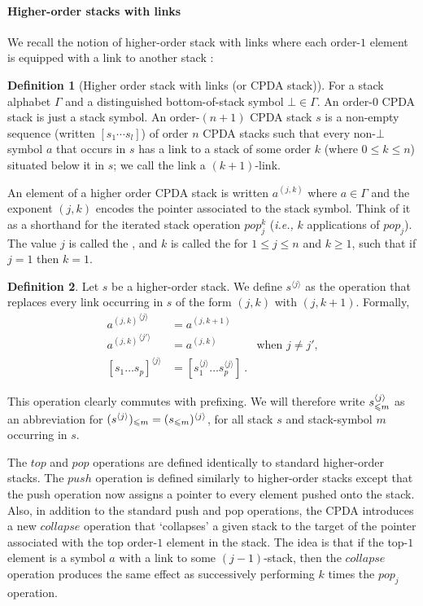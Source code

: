 \documentclass[a4paper]{article}[12pt]
\theoremstyle{remark}
\theoremstyle{definition}
\newtheorem{definition}{Definition}[section]
\begin{document}
\paragraph{Higher-order stacks with links}

We recall the notion of higher-order stack with links where each order-$1$ element is equipped with a link to another stack \cite{hague-collaps-full}:

\begin{definition}[Higher order stack with links (or CPDA stack)]
For a stack alphabet $\Gamma$ and a distinguished bottom-of-stack symbol $\bot\in \Gamma$. An order-$0$ CPDA stack is just a stack symbol. An order-$(n+1)$ CPDA stack $s$ is a non-empty sequence (written $[s_1 \cdots s_l]$) of order $n$ CPDA stacks such that every non-$\bot$ symbol $a$ that occurs in $s$ has a link to a stack of some order $k$ (where $0 \leq k \leq n$) situated below it in $s$; we call the link a $(k + 1)$-link.
\end{definition}

An element of a higher order CPDA stack is written $a^{(j,k)}$ where $a\in \Gamma$ and the exponent $(j,k)$ encodes the pointer associated to the stack symbol. Think of it as a shorthand for the iterated stack operation $pop_j^k$ ({\it i.e.,} $k$ applications of $pop_j$).
The value $j$ is called the , and $k$ is called the  for $1 \leq j \leq n$ and $k \geq 1$, such that if $j = 1$ then $k = 1$.

\begin{definition}
Let $s$ be a higher-order stack. We define $s^{\langle j \rangle}$ as the operation that replaces
every link occurring in $s$ of the form $(j,k)$ with $(j,k+1)$. Formally,
\begin{align*}
{a^{(j,k)}}^{\langle j \rangle} &= a^{(j,k+1)}   \\
{a^{(j,k)}}^{\langle j' \rangle} &= a^{(j,k)} &   \mbox{when $j\neq j'$,}\\
[s_1 \ldots s_p]^{\langle j \rangle} &= [s_1^{\langle j \rangle} \ldots s_p^{\langle j \rangle}] \ .
\end{align*}
\end{definition}
This operation clearly commutes with prefixing. We will therefore write $s^{\langle j\rangle}_{\leqslant m}$ as an abbreviation for
$(s^{\langle j\rangle})_{\leqslant m} = (s_{\leqslant m})^{\langle j\rangle}$,
for all stack $s$ and stack-symbol $m$ occurring in $s$.


The $top$ and $pop$ operations are defined identically to standard higher-order stacks.
The $push$ operation is defined similarly to higher-order stacks except that the push operation now assigns a pointer to every element pushed onto the stack. Also, in addition to the standard push and pop operations, the CPDA introduces a new $collapse$ operation that `collapses' a given stack to the target of the pointer associated with the top order-$1$ element in the stack. The idea is that if the top-$1$ element is a symbol $a$ with a link to some $(j - 1)$-stack, then the $collapse$ operation produces the same effect as successively performing $k$ times the $pop_j$ operation.
\end{document}
